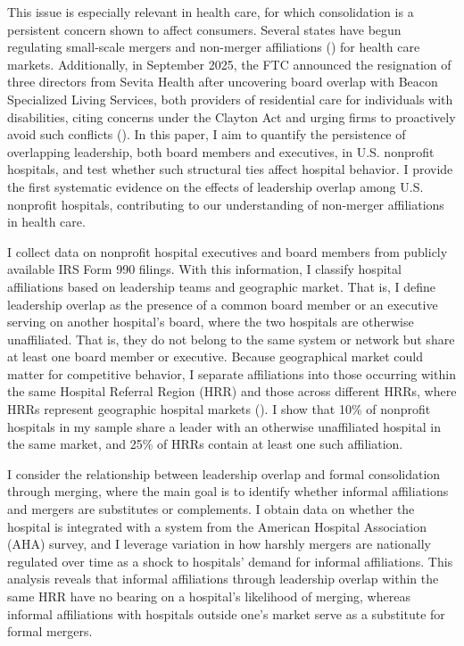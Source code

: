\documentclass[12pt]{article}
\begin{document}
    This issue is especially relevant in health care, for which consolidation is a persistent concern shown to affect consumers. Several states have begun regulating small-scale mergers and non-merger affiliations (\cite{ncsl2024healthcare}) for health care markets. Additionally, in September 2025, the FTC announced the resignation of three directors from Sevita Health after uncovering board overlap with Beacon Specialized Living Services, both providers of residential care for individuals with disabilities, citing concerns under the Clayton Act and urging firms to proactively avoid such conflicts (\cite{ftc2025sevita}). In this paper, I aim to quantify the persistence of overlapping leadership, both board members and executives, in U.S. nonprofit hospitals, and test whether such structural ties affect hospital behavior. I provide the first systematic evidence on the effects of leadership overlap among U.S. nonprofit hospitals, contributing to our understanding of non-merger affiliations in health care.

    I collect data on nonprofit hospital executives and board members from publicly available IRS Form 990 filings. With this information, I classify hospital affiliations based on leadership teams and geographic market. That is, I define leadership overlap as the presence of a common board member or an executive serving on another hospital’s board, where the two hospitals are otherwise unaffiliated. That is, they do not belong to the same system or network but share at least one board member or executive. Because geographical market could matter for competitive behavior, I separate affiliations into those occurring within the same Hospital Referral Region (HRR) and those across different HRRs, where HRRs represent geographic hospital markets (\cite{Wennberg1973SmallAV}). I show that 10\% of nonprofit hospitals in my sample share a leader with an otherwise unaffiliated hospital in the same market, and 25\% of HRRs contain at least one such affiliation.

    I consider the relationship between leadership overlap and formal consolidation through merging, where the main goal is to identify whether informal affiliations and mergers are substitutes or complements. I obtain data on whether the hospital is integrated with a system from the American Hospital Association (AHA) survey, and I leverage variation in how harshly mergers are nationally regulated over time as a shock to hospitals' demand for informal affiliations. This analysis reveals that informal affiliations through leadership overlap within the same HRR have no bearing on a hospital's likelihood of merging, whereas informal affiliations with hospitals outside one's market serve as a substitute for formal mergers. 
\end{document}
